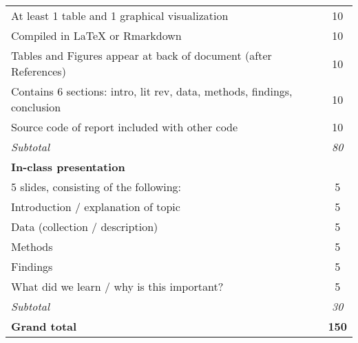 \documentclass[12pt,english]{article}
\begin{document}
\begin{center}
\begin{tabular}{l|c|c}
At least 1 table and 1 graphical visualization                                               &               & 10                       \\
Compiled in LaTeX or Rmarkdown                                                               &               & 10                       \\
Tables and Figures appear at back of document (after References)                             &               & 10                       \\
Contains 6 sections: intro, lit rev, data, methods, findings, conclusion                  &               & 10                       \\
Source code of report included with other code                                               &               & 10                       \\
\hline
\textit{Subtotal}                                                                            &               & \textit{80}              \\
\hline
\textbf{In-class presentation}                                                               &               &                          \\
5 slides, consisting of the following:                                                       &               & 5                        \\
Introduction / explanation of topic                                                          &               & 5                        \\
Data (collection / description)                                                              &               & 5                        \\
Methods                                                                                      &               & 5                        \\
Findings                                                                                     &               & 5                        \\
What did we learn / why is this important?                                                   &               & 5                        \\
\hline
\textit{Subtotal}                                                                            &               & \textit{30}              \\
\hline
\textbf{Grand total}                                                                         &               & \textbf{150}            \\
\hline
\end{tabular}
\end{center}

\end{document}
